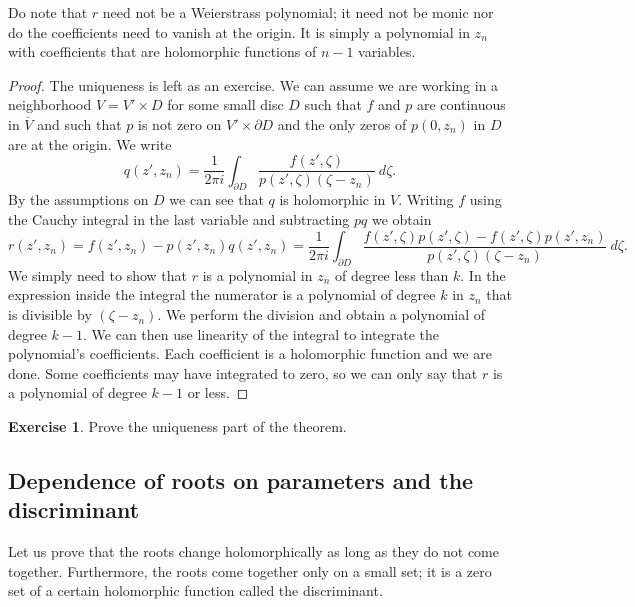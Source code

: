 \documentclass[12pt,openany]{book}
\theoremstyle{plain}
\theoremstyle{remark}
\theoremstyle{definition}
\theoremstyle{exercise}
\newtheorem{exercise}{Exercise}[section]
\theoremstyle{example}
\begin{document}
Do note that $r$ need not be a Weierstrass polynomial; it need not be monic
nor do the coefficients need to vanish at the origin.  It is simply a
polynomial in $z_n$ with coefficients that are holomorphic functions
of $n-1$ variables.

\begin{proof}
The uniqueness is left as an exercise.  We can assume we are working
in a neighborhood $V = V' \times D$ for some small disc $D$
such that $f$ and $p$ are continuous in $\overline{V}$ and
such that $p$ is not zero on $V' \times \partial D$ and the
only zeros of $p(0,z_n)$ in $D$ are at the origin.  We write
\begin{equation}
q(z',z_n) =
\frac{1}{2\pi i} \int_{\partial D} \frac{f(z',\zeta)}{p(z',\zeta)(\zeta-z_n)}
~d\zeta .
\end{equation}
By the assumptions on $D$ we can see that $q$ is holomorphic in $V$. 
Writing $f$ using the Cauchy integral in the last variable and
subtracting $pq$ we obtain
\begin{equation}
r(z',z_n) = f(z',z_n) - p(z',z_n)q(z',z_n)
=
\frac{1}{2\pi i}
\int_{\partial D} \frac{f(z',\zeta)p(z',\zeta) - f(z',\zeta)p(z',z_n)}{p(z',\zeta)(\zeta-z_n)}
~d\zeta .
\end{equation}
We simply need to show that $r$ is a polynomial in $z_n$ of degree less than
$k$.  In the expression inside the integral the numerator is
a polynomial of degree $k$ in $z_n$ that is divisible
by $(\zeta-z_n)$.  We perform the division and obtain a polynomial
of degree $k-1$.  We can then use linearity of the integral
to integrate the polynomial's coefficients.  Each coefficient is a
holomorphic function and we are done.  Some coefficients may have
integrated to zero, so we can only say that $r$ is a polynomial
of degree $k-1$ or less.
\end{proof}

\begin{exercise}
Prove the uniqueness part of the theorem.
\end{exercise}

\subsection{Dependence of roots on parameters and the discriminant}

Let us prove that the roots change holomorphically as long as they do not
come together.  Furthermore, the roots come together
only on a small set; it is a zero set of a certain holomorphic function
called the discriminant.
\end{document}
